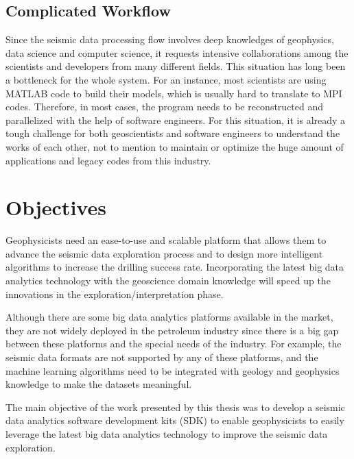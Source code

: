 \subsection{Complicated Workflow}

Since the seismic data processing flow involves deep knowledges of geophysics, data science and computer science, it requests intensive collaborations among the scientists and developers from many different fields. This situation has long been a bottleneck for the whole system. For an instance, most scientists are using MATLAB code to build their models, which is usually hard to translate to MPI codes. Therefore, in most cases, the program needs to be reconstructed and parallelized with the help of software engineers. For this situation, it is already a tough challenge for both geoscientists and software engineers to understand the works of each other, not to mention to maintain or optimize the huge amount of applications and  legacy codes from this industry.


\section{Objectives}

Geophysicists need an ease-to-use and scalable platform that allows them to advance the seismic data exploration process and to design more intelligent algorithms to increase the drilling success rate. Incorporating the latest big data analytics technology with the geoscience domain knowledge will speed up the innovations in the exploration/interpretation phase.

Although there are some big data analytics platforms available in the market, they are not widely deployed in the petroleum industry since there is a big gap between these platforms and the special needs of the industry. For example, the seismic data formats are not supported by any of these platforms, and the machine learning algorithms need to be integrated with geology and geophysics knowledge to make the datasets meaningful.

The main objective of the work presented by this thesis was to develop a seismic data analytics software development kits (SDK) to enable geophysicists to easily leverage the latest big data analytics technology to improve the seismic data exploration.




